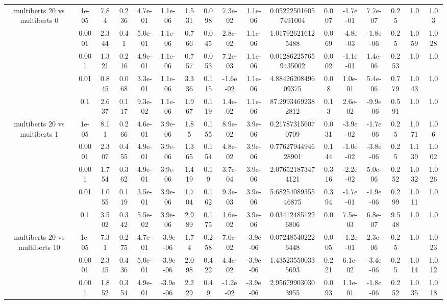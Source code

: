\begin{tabular}{|c|c|c|c|c|c|c|c|c|c|c|c|c|c|c|c|c|}
\hline
\multirow{5}{*}{multiberts 20 vs multiberts 0} & 1e-05 & 7.84 & 0.236 & 4.7e-01 & 1.1e-06 & 1.531 & 0.098 & 7.3e-02 & 1.1e-06 & 0.052225016057491004 & 0.007 & -1.7e-01 & 7.7e-07 & 0.25 & 1.0 & 1.03 \\
 & 0.0001 & 2.344 & 0.41 & 5.0e-01 & 1.1e-06 & 0.766 & 0.045 & 2.8e-02 & 1.1e-06 & 1.017926216125488 & 0.069 & -4.8e-03 & -1.8e-06 & 0.25 & 1.059 & 1.028 \\
 & 0.001 & 1.321 & 0.216 & 4.9e-01 & 1.1e-06 & 0.757 & 0.053 & 7.2e-03 & 1.1e-06 & 0.012862257659435002 & 0.002 & -1.1e-01 & 1.4e-06 & 0.253 & 1.0 & 1.0 \\
 & 0.01 & 0.845 & 0.068 & 3.3e-01 & 1.1e-06 & 3.336 & 0.115 & -1.6e-02 & 1.1e-06 & 4.8842620849609375 & 0.08 & 1.0e-01 & 5.4e-06 & 0.779 & 1.043 & 1.0 \\
 & 0.1 & 2.637 & 0.117 & 9.3e-02 & 1.1e-06 & 1.967 & 0.119 & 1.4e-02 & 1.1e-06 & 87.29934692382812 & 0.13 & 2.6e-02 & -9.9e-06 & 0.591 & 1.0 & 1.0 \\
\hline
\multirow{5}{*}{multiberts 20 vs multiberts 1} & 1e-05 & 8.11 & 0.266 & 4.6e-01 & 3.9e-06 & 1.85 & 0.155 & 8.9e-02 & 3.9e-06 & 0.217873156070709 & 0.031 & -3.9e-02 & -1.7e-06 & 0.25 & 1.071 & 1.06 \\
 & 0.0001 & 2.307 & 0.455 & 4.9e-01 & 3.9e-06 & 1.365 & 0.154 & 4.8e-02 & 3.9e-06 & 0.7762794494628901 & 0.144 & -1.0e-02 & -3.8e-06 & 0.25 & 1.139 & 1.002 \\
 & 0.001 & 1.754 & 0.362 & 4.9e-01 & 3.9e-06 & 1.419 & 0.19 & 3.7e-04 & 3.9e-06 & 2.076521873474121 & 0.316 & -2.2e-02 & 5.0e-06 & 0.252 & 1.032 & 1.026 \\
 & 0.01 & 1.055 & 0.119 & 3.5e-01 & 3.9e-06 & 1.704 & 0.162 & 9.3e-03 & 3.9e-06 & 5.6825408935546875 & 0.394 & -1.7e-01 & -1.9e-06 & 0.299 & 1.011 & 1.0 \\
 & 0.1 & 3.502 & 0.342 & 5.5e-02 & 3.9e-06 & 2.989 & 0.175 & 1.6e-02 & 3.9e-06 & 0.034124851226806 & 0.0 & 7.5e-03 & 6.8e-07 & 9.548 & 1.0 & 1.0 \\
\hline
\multirow{5}{*}{multiberts 20 vs multiberts 10} & 1e-05 & 7.31 & 0.275 & 4.7e-01 & -3.9e-06 & 1.74 & 0.258 & 7.0e-02 & -3.9e-06 & 0.072485402226448 & 0.005 & -1.2e-01 & 2.3e-06 & 0.25 & 1.0 & 1.023 \\
 & 0.0001 & 2.345 & 0.436 & 5.0e-01 & -3.9e-06 & 2.098 & 0.422 & 4.4e-02 & -3.9e-06 & 1.435235500335693 & 0.221 & 6.1e-02 & -3.4e-06 & 0.25 & 1.014 & 1.012 \\
 & 0.001 & 1.852 & 0.354 & 4.9e-01 & -3.9e-06 & 2.229 & 0.49 & -1.2e-02 & -3.9e-06 & 2.956799030303955 & 0.093 & 1.1e-01 & -1.8e-06 & 0.252 & 1.035 & 1.018 \\

\end{tabular}
